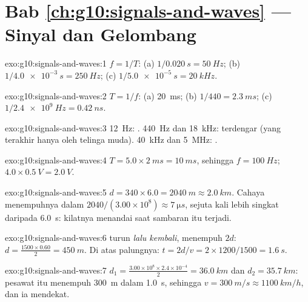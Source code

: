 \section*{Bab \ref{ch:g10:signals-and-waves} --- Sinyal dan Gelombang}

\begin{solution}{exo:g10:signals-and-waves:1}
$f = 1/T$: (a) $1/\qty{0.020}{s} = \qty{50}{Hz}$;
(b) $1/\qty{4.0e-3}{s} = \qty{250}{Hz}$;
(c) $1/\qty{5.0e-5}{s} = \qty{20}{kHz}$.
\end{solution}

\begin{solution}{exo:g10:signals-and-waves:2}
$T = 1/f$: (a) \qty{20}{ms}; (b) $1/440 = \qty{2.3}{ms}$;
(c) $1/\qty{2.4e9}{Hz} = \qty{0.42}{ns}$.
\end{solution}

\begin{solution}{exo:g10:signals-and-waves:3}
\qty{12}{Hz}: . \qty{440}{Hz} dan \qty{18}{kHz}: terdengar
(yang terakhir hanya oleh telinga muda). \qty{40}{kHz} dan \qty{5}{MHz}:
.
\end{solution}

\begin{solution}{exo:g10:signals-and-waves:4}
$T = 5.0 \times \qty{2}{ms} = \qty{10}{ms}$, sehingga
$f = \qty{100}{Hz}$; 
$4.0 \times \qty{0.5}{V} = \qty{2.0}{V}$.
\end{solution}

\begin{solution}{exo:g10:signals-and-waves:5}
$d = 340 \times 6.0 = \qty{2040}{m} \approx \qty{2.0}{km}$. Cahaya
menempuhnya dalam $2040/(3.00\times10^{8}) \approx \qty{7}{\micro s}$,
sejuta kali lebih singkat daripada \qty{6.0}{s}: kilatnya menandai saat
sambaran itu terjadi.
\end{solution}

\begin{solution}{exo:g10:signals-and-waves:6}
 turun \emph{lalu kembali}, menempuh $2d$:
$d = \frac{1500 \times 0.60}{2} = \qty{450}{m}$. Di atas palungnya:
$t = 2d/v = 2 \times 1200/1500 = \qty{1.6}{s}$.
\end{solution}

\begin{solution}{exo:g10:signals-and-waves:7}
$d_1 = \frac{3.00\times10^{8} \times 2.4\times10^{-4}}{2} =
\qty{36.0}{km}$ dan $d_2 = \qty{35.7}{km}$: pesawat itu menempuh
\qty{300}{m} dalam \qty{1.0}{s}, sehingga $v = \qty{300}{m/s} \approx
\qty{1100}{km/h}$, dan ia mendekat.
\end{solution}

